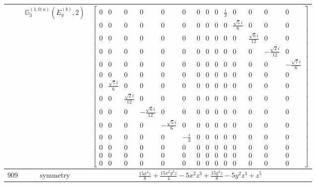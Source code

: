 \documentclass[fleqn,8pt,landscape]{jsarticle}
\begin{document}
\begin{longtable}{ccc}
$  $ & $ \mathbb{G}_{3}^{(1,0;a)}(E_{g}^{(b)},2) $ & $ \begin{bmatrix} 0 & 0 & 0 & 0 & 0 & 0 & 0 & 0 & 0 & \frac{i}{3} & 0 & 0 & 0 & 0 \\ 0 & 0 & 0 & 0 & 0 & 0 & 0 & 0 & 0 & 0 & \frac{\sqrt{5} i}{6} & 0 & 0 & 0 \\ 0 & 0 & 0 & 0 & 0 & 0 & 0 & 0 & 0 & 0 & 0 & \frac{\sqrt{6} i}{12} & 0 & 0 \\ 0 & 0 & 0 & 0 & 0 & 0 & 0 & 0 & 0 & 0 & 0 & 0 & - \frac{\sqrt{2} i}{12} & 0 \\ 0 & 0 & 0 & 0 & 0 & 0 & 0 & 0 & 0 & 0 & 0 & 0 & 0 & - \frac{\sqrt{7} i}{6} \\ 0 & 0 & 0 & 0 & 0 & 0 & 0 & 0 & 0 & 0 & 0 & 0 & 0 & 0 \\ 0 & \frac{\sqrt{7} i}{6} & 0 & 0 & 0 & 0 & 0 & 0 & 0 & 0 & 0 & 0 & 0 & 0 \\ 0 & 0 & \frac{\sqrt{2} i}{12} & 0 & 0 & 0 & 0 & 0 & 0 & 0 & 0 & 0 & 0 & 0 \\ 0 & 0 & 0 & - \frac{\sqrt{6} i}{12} & 0 & 0 & 0 & 0 & 0 & 0 & 0 & 0 & 0 & 0 \\ 0 & 0 & 0 & 0 & - \frac{\sqrt{5} i}{6} & 0 & 0 & 0 & 0 & 0 & 0 & 0 & 0 & 0 \\ 0 & 0 & 0 & 0 & 0 & - \frac{i}{3} & 0 & 0 & 0 & 0 & 0 & 0 & 0 & 0 \\ 0 & 0 & 0 & 0 & 0 & 0 & 0 & 0 & 0 & 0 & 0 & 0 & 0 & 0 \\ 0 & 0 & 0 & 0 & 0 & 0 & 0 & 0 & 0 & 0 & 0 & 0 & 0 & 0 \\ 0 & 0 & 0 & 0 & 0 & 0 & 0 & 0 & 0 & 0 & 0 & 0 & 0 & 0 \end{bmatrix} $ \\ \hline
$ 909 $ & $ \text{symmetry} $ & $ \frac{15 x^{4} z}{8} + \frac{15 x^{2} y^{2} z}{4} - 5 x^{2} z^{3} + \frac{15 y^{4} z}{8} - 5 y^{2} z^{3} + z^{5} $ \\

\end{longtable}
\end{document}
